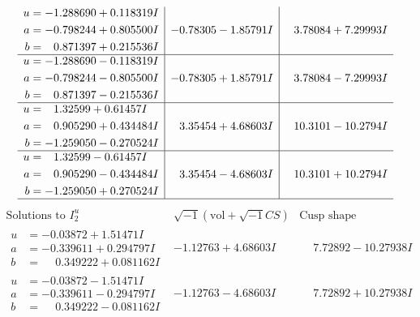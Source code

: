 \documentclass[1p]{elsarticle_modified}
\theoremstyle{definition}
\newcommand{\I}{\sqrt{-1}}
\begin{document}
$$\begin{array}{c|c|c}
\begin{aligned}
u &= -1.288690 + 0.118319 I \\
a &= -0.798244 + 0.805500 I \\
b &= \phantom{-}0.871397 + 0.215536 I\end{aligned}
 & -0.78305 - 1.85791 I & \phantom{-}3.78084 + 7.29993 I \\ \hline\begin{aligned}
u &= -1.288690 - 0.118319 I \\
a &= -0.798244 - 0.805500 I \\
b &= \phantom{-}0.871397 - 0.215536 I\end{aligned}
 & -0.78305 + 1.85791 I & \phantom{-}3.78084 - 7.29993 I \\ \hline\begin{aligned}
u &= \phantom{-}1.32599 + 0.61457 I \\
a &= \phantom{-}0.905290 + 0.434484 I \\
b &= -1.259050 - 0.270524 I\end{aligned}
 & \phantom{-}3.35454 + 4.68603 I & \phantom{-}10.3101 - 10.2794 I \\ \hline\begin{aligned}
u &= \phantom{-}1.32599 - 0.61457 I \\
a &= \phantom{-}0.905290 - 0.434484 I \\
b &= -1.259050 + 0.270524 I\end{aligned}
 & \phantom{-}3.35454 - 4.68603 I & \phantom{-}10.3101 + 10.2794 I\\
 \hline 
 \end{array}$$\newpage$$\begin{array}{c|c|c}  
\text{Solutions to }I^u_{2}& \I (\text{vol} + \sqrt{-1}CS) & \text{Cusp shape}\\
 \hline 
\begin{aligned}
u &= -0.03872 + 1.51471 I \\
a &= -0.339611 + 0.294797 I \\
b &= \phantom{-}0.349222 + 0.081162 I\end{aligned}
 & -1.12763 + 4.68603 I & \phantom{-}7.72892 - 10.27938 I \\ \hline\begin{aligned}
u &= -0.03872 - 1.51471 I \\
a &= -0.339611 - 0.294797 I \\
b &= \phantom{-}0.349222 - 0.081162 I\end{aligned}
 & -1.12763 - 4.68603 I & \phantom{-}7.72892 + 10.27938 I \\ \hline\begin{aligned}

\end{aligned}
\end{array}$$
\end{document}
